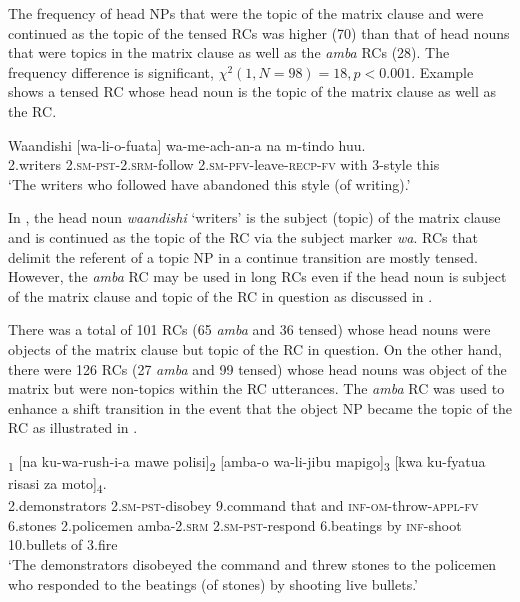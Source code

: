 \documentclass[output=paper,colorlinks,citecolor=brown]{langscibook}
\begin{document}
The frequency of head NPs that were the topic of the matrix clause and were continued as the topic of the tensed RCs was higher (70) than that of head nouns that were topics in the matrix clause as well as the \textit{amba} RCs (28). The frequency difference is significant, $\chi^2 (1,N=98)=18, p<0.001$. Example  shows a tensed RC whose head noun is the topic of the matrix clause as well as the RC.

\ea%
    \label{ex:mwamzandi:27}
    \gll    Waandishi [wa-li-o-fuata] wa-me-ach-an-a na m-tindo huu.\\
            2.writers \textsc{2.sm-pst-2.srm-}follow \textsc{2.sm-pfv-}leave\textsc{-recp-fv} with 3-style this\\
    \glt    ‘The writers who followed have abandoned this style (of writing).’
\z

In , the head noun \textit{waandishi} ‘writers’ is the subject (topic) of the matrix clause and is continued as the topic of the RC via the subject marker \textit{wa}. RCs that delimit the referent of a topic NP in a continue transition are mostly tensed. However, the \textit{amba} RC may be used in long RCs even if the head noun is subject of the matrix clause and topic of the RC in question as discussed in .

There was a total of 101 RCs (65 \textit{amba} \-and 36 tensed) whose head nouns were objects of the matrix clause but topic of the RC in question. On the other hand, there were 126 RCs (27 \textit{amba} and 99 tensed) whose head nouns was object of the matrix but were non-topics within the RC utterances. The \textit{amba} RC was used to enhance a shift transition in the event that the object NP became the topic of the RC as illustrated in .

\ea%
    \label{ex:mwamzandi:28}
    \textsubscript{1} [na ku-wa-rush-i-a mawe polisi]\textsubscript{2} [amba-o wa-li-jibu mapigo]\textsubscript{3} [kwa ku-fyatua risasi za moto]\textsubscript{4}.\\
            2.demonstrators \textsc{2.sm-pst-}disobey 9.command that and \textsc{inf-om-}throw\textsc{-appl-fv} 6.stones 2.policemen amba\textsc{-2.srm} \textsc{2.sm-pst-}respond 6.beatings by \textsc{inf-}shoot 10.bullets of 3.fire\\
    \glt    ‘The demonstrators disobeyed the command and threw stones to the policemen who responded to the beatings (of stones) by shooting live bullets.’
\z
\end{document}
